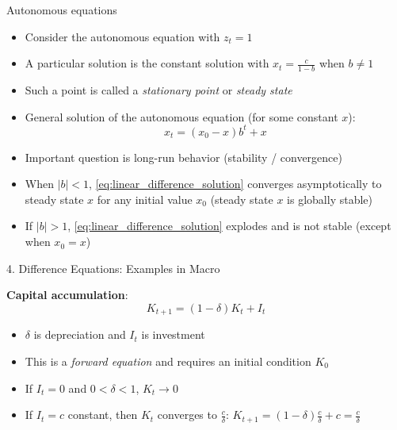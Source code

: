 \documentclass[10pt]{beamer}
\begin{document}
\begin{frame}{Autonomous equations}
\begin{itemize}
\item Consider the autonomous equation with $z_t = 1$ 

\item A particular solution is the constant solution with $x_t = \frac{c}{1-b}$ when $b \neq 1$

\item Such a point is called a \textit{stationary point} or \textit{steady state}

\item General solution of the autonomous equation (for some constant $x$):
\begin{equation}\label{eq:linear_difference_solution}
	x_t = (x_0 - x) b^t + x
\end{equation}

\item Important question is long-run behavior (stability / convergence)

\item When $| b | < 1$, \eqref{eq:linear_difference_solution} converges asymptotically to steady state $x$ for any initial value $x_0$ (steady state $x$ is globally stable) 

\item If $| b | > 1$, \eqref{eq:linear_difference_solution} explodes and is not stable (except when $x_0 = x$)
\end{itemize}
\end{frame}



\begin{frame}{4. Difference Equations: Examples in Macro}

\textbf{Capital accumulation}:
\begin{equation*}
	K_{t+1} = (1 - \delta) K_t + I_t
\end{equation*}
\begin{itemize}
\item $\delta$ is depreciation and $I_t$ is investment

\item This is a \textit{forward equation} and requires an initial condition $K_0$

\item If $I_t = 0$ and $0 < \delta < 1$, $K_t \to 0$

\item If $I_t = c$ constant, then $K_t$ converges to $\frac{c}{\delta}$: $K_{t+1} = (1-\delta) \frac{c}{\delta} + c = \frac{c}{\delta}$
\end{itemize}
\end{frame}
\end{document}

